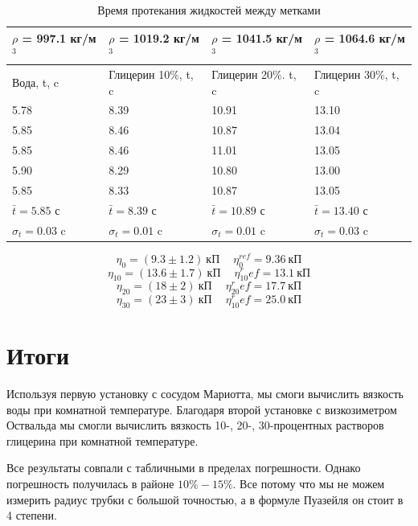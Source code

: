 \documentclass[a4paper]{article}
\begin{document}
   \begin{table}[h]
    \centering
    \begin{center}
    \end{center}
    \vspace{0.05cm}
    \begin{tabular}{ |p{3cm}|p{3cm}|p{3cm}|p{3cm}| }
    \hline
    $\rho$ = 997.1 кг/м$^3$ & $\rho$ = 1019.2 кг/м$^3$ & $\rho$ = 1041.5 кг/м$^3$ & $\rho$ = 1064.6 кг/м$^3$\\
    \hline
     Вода, t, c & Глицерин 10\%, t, c & Глицерин 20\%. t, c & Глицерин 30\%, t, c \\ 
    \hline
    5.78 & 8.39 & 10.91 & 13.10\\
    5.85 & 8.46 & 10.87 & 13.04\\
    5.85 & 8.46 & 11.01 & 13.05\\
    5.90 & 8.29 & 10.80 & 13.00\\
    5.85 & 8.33 & 10.87 & 13.05\\
    
    \hline
    \hline
    
    $\bar t = 5.85$ с & $\bar t = 8.39$ с & $\bar t = 10.89$ с & $\bar t = 13.40$ с \\
    \hline
    $\sigma_t = 0.03$ c & $\sigma_t = 0.01$ c & $\sigma_t = 0.01$ c & $\sigma_t = 0.03$ c \\
    \hline
    \end{tabular}
    \caption{Время протекания жидкостей между метками}
    \end{table}

\newpage

\begin{equation}
    \eta_{ 0} = (9.3 \pm 1.2) \ \text{кП} \quad \ \eta_{ 0}^{ref} = 9.36 \ \text{кП}
\end{equation}
\begin{equation}
    \eta_{10} = (13.6 \pm 1.7) \ \text{кП} \quad \ \eta_{10}^ref = 13.1 \ \text{кП} 
\end{equation}
\begin{equation}
    \eta_{20} = (18 \pm 2) \ \text{кП} \quad \ \eta_{20}^ref = 17.7 \ \text{кП} 
\end{equation}
\begin{equation}
    \eta_{30} = (23 \pm 3) \ \text{кП} \quad \ \eta_{10}^ref = 25.0 \ \text{кП} 
\end{equation}


\section{Итоги}

Используя первую установку с сосудом Мариотта, мы смоги вычислить вязкость 
воды при комнатной температуре.
Благодаря второй установке с визкозиметром Оствальда мы смогли вычислить
вязкость 10-, 20-, 30-процентных растворов глицерина при комнатной температуре.

Все результаты совпали с табличными в пределах погрешности.
Однако погрешность получилась в районе $10\%-15\%$. 
Все потому что мы не можем измерить радиус трубки с большой точностью, а 
в формуле Пуазейля он стоит в 4 степени.

\newpage
\end{document}
